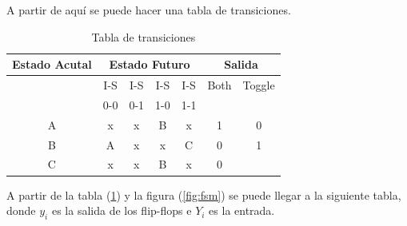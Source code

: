 A partir de aquí se puede hacer una tabla de transiciones.
\begin{table}[H]
\centering
\begin{tabular}{|c|cccc|cc|}
\hline
\textbf{Estado Acutal} & \multicolumn{4}{c|}{\textbf{Estado Futuro}} & \multicolumn{2}{c|}{\textbf{Salida}} \\ \hline
                       & I-S       & I-S       & I-S      & I-S               & Both        & Toggle        \\
                       & 0-0       & 0-1       & 1-0      & 1-1                  &            &           \\ \hline
A                      & x         & x         & B        & x                   & 1          & 0         \\ \cline{1-1}
B                      & A         & x         & x        & C                  & 0          & 1         \\ \cline{1-1}
C                      & x         & x         & B        & x                  & 0         \\ \hline
\end{tabular}
\caption{Tabla de transiciones}
\label{tab:estados}
\end{table}
A partir de la tabla (\ref{tab:estados}) y la figura (\ref{fig:fsm}) se puede llegar a la siguiente tabla, donde $y_i$ es la salida de los flip-flops e $Y_i$ es la entrada.
